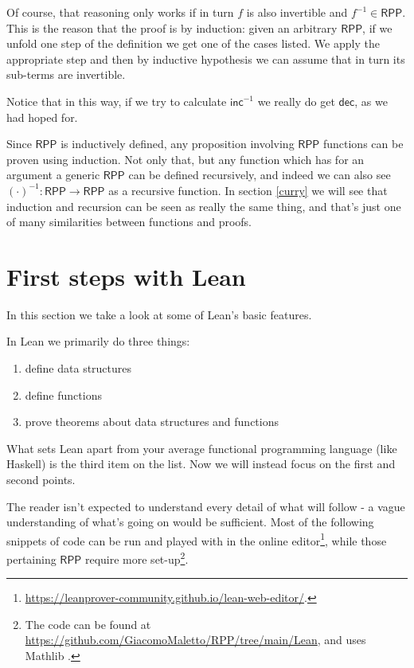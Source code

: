 \documentclass[oneside]{book}
\theoremstyle{definition}
\theoremstyle{remark}
\theoremstyle{plain}
\newcommand{\RPP}{\mathsf{RPP}}
\newcommand{\rppinc}{\mathsf{inc}}
\newcommand{\rppdec}{\mathsf{dec}}
\begin{document}
Of course, that reasoning only works if in turn $f$ is also invertible and $f^{-1} \in \RPP$.
This is the reason that the proof is by induction:
given an arbitrary $\RPP$, if we unfold one step of the definition we get one of the cases listed.
We apply the appropriate step and then by inductive hypothesis we can assume that in turn its sub-terms are invertible.

Notice that in this way, if we try to calculate $\rppinc^{-1}$ we really do get $\rppdec$, as we had hoped for.

Since $\RPP$ is inductively defined, any proposition involving $\RPP$ functions can be proven using induction.
Not only that, but any function which has for an argument a generic $\RPP$ can be defined recursively,
and indeed we can also see $(\cdot)^{-1}:\RPP \to \RPP$ as a recursive function.
In section \ref{curry} we will see that induction and recursion can be seen as really the same thing,
and that's just one of many similarities between functions and proofs.

\section{First steps with Lean}

In this section we take a look at some of Lean's basic features.

In Lean we primarily do three things:
\begin{enumerate}
\item define data structures
\item define functions
\item prove theorems about data structures and functions
\end{enumerate}
What sets Lean apart from your average functional programming language (like Haskell) is the third item on the list.
Now we will instead focus on the first and second points.

The reader isn't expected to understand every detail of what will follow -
a vague understanding of what's going on would be sufficient.
Most of the following snippets of code can be run and played with
in the online editor\footnote{\url{https://leanprover-community.github.io/lean-web-editor/}.},
while those pertaining $\RPP$ require more set-up\footnote{The code can be found at \url{https://github.com/GiacomoMaletto/RPP/tree/main/Lean},
and uses Mathlib \cite{mathlib}.}.
\end{document}
